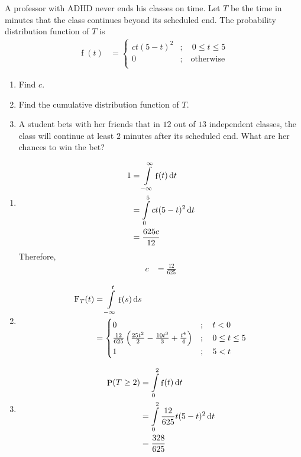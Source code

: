 \documentclass[fleqn, a4paper, 11pt, oneside]{amsart}
\theoremstyle{definition}
\theoremstyle{theorem}
\DeclareMathOperator{\prob}{\mathrm{P}}
\DeclareMathOperator{\pdf}{\mathrm{f}}
\newcommand*{\cdf}[1]{\mathrm{F}_{#1}}
\begin{document}
\begin{question}
	A professor with ADHD never ends his classes on time.
	Let $T$ be the time in minutes that the class continues beyond its scheduled end.
	The probability distribution function of $T$ is
	\begin{align*}
		\pdf(t) &=
			\begin{cases}
				c t (5 - t)^2 &;\quad 0 \le t \le 5\\
				0 &;\quad \text{otherwise}\\
			\end{cases}
	\end{align*}
	\begin{enumerate}
		\item
			Find $c$.
		\item
			Find the cumulative distribution function of $T$.
		\item
			A student bets with her friends that in $12$ out of $13$ independent classes, the class will continue at least $2$ minutes after its scheduled end.
			What are her chances to win the bet?
	\end{enumerate}
\end{question}

\begin{solution}
	\begin{enumerate}[leftmargin=*]
		\item
			\begin{align*}
				1 &= \int\limits_{-\infty}^{\infty} \pdf(t) \dif t\\
				&= \int\limits_{0}^{5} c t (5 - t)^2 \dif t\\
				&= \frac{625 c}{12}
			\end{align*}
			Therefore,
			\begin{align*}
				c &= \frac{12}{625}
			\end{align*}
		\item
			\begin{align*}
				\cdf{T}(t) &= \int\limits_{-\infty}^{t} \pdf(s) \dif s\\
				&=
					\begin{cases}
						0 &;\quad t < 0\\
						\frac{12}{625} \left( \frac{25 t^2}{2} - \frac{10 t^3}{3} + \frac{t^4}{4} \right) &;\quad 0 \le t \le 5\\
						1 &;\quad 5 < t\\
					\end{cases}
			\end{align*}
		\item
			\begin{align*}
				\prob(T \ge 2) &= \int\limits_{0}^{2} \pdf(t) \dif t\\
				&= \int\limits_{0}^{2} \frac{12}{625} t (5 - t)^2 \dif t\\
				&= \frac{328}{625}
			\end{align*}
	\end{enumerate}
\end{solution}
\end{document}
